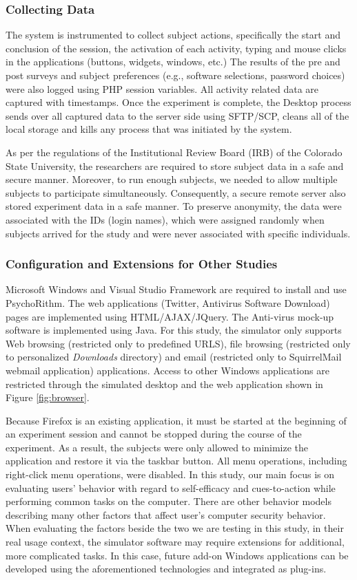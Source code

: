 \subsubsection{Collecting Data}
The system is instrumented to collect subject actions, specifically the start and conclusion of the session, the activation of each activity, typing and mouse clicks in the applications (buttons, widgets, windows, etc.) The results of the pre and post surveys and subject preferences (e.g., software selections, password choices) were also logged using PHP session variables. All activity related data are captured with timestamps. Once the experiment is complete, the Desktop
process sends over all captured data to the server side using SFTP/SCP, cleans all of the local storage and kills any process that was initiated by the system.

As per the regulations of the Institutional Review Board (IRB) of the Colorado State University, the researchers are required to store subject data in a safe and secure manner. Moreover, to run enough subjects, we needed to allow multiple subjects to participate simultaneously. Consequently, a secure remote server also stored experiment data in a safe manner. To preserve anonymity, the data were associated with the IDs (login names), which were assigned randomly when subjects arrived for the study and were never associated with specific individuals.

\subsubsection{Configuration and Extensions for Other Studies}
\sloppy
Microsoft Windows and Visual Studio Framework are required to install and use PsychoRithm. 
The web applications (Twitter, Antivirus Software Download) pages are implemented using HTML/AJAX/JQuery. 
The Anti-virus mock-up software is implemented using Java. 
For this study, the simulator only supports Web browsing (restricted only to predefined URLS), file browsing (restricted only to personalized \textit{Downloads} directory) and email (restricted only to SquirrelMail webmail application) applications. Access to other Windows applications are restricted through the simulated desktop and the web application shown in Figure \ref{fig:browser}. 

Because Firefox is an existing application, it must be started at the beginning of an experiment session and cannot be stopped during the course of the experiment. 
As a result, the subjects were only allowed to minimize the application and restore it via the taskbar button. 
All menu operations, including right-click menu operations, were disabled. 
In this study, our main focus is on evaluating users' behavior with regard to self-efficacy and cues-to-action while performing common tasks on the computer. 
There are other behavior models describing many other factors that affect user's computer security behavior. 
When evaluating the factors beside the two we are testing in this study, in their real usage context, the simulator software may require extensions for additional, more complicated tasks. 
In this case, future add-on Windows applications can be developed using the aforementioned technologies and integrated as plug-ins.


